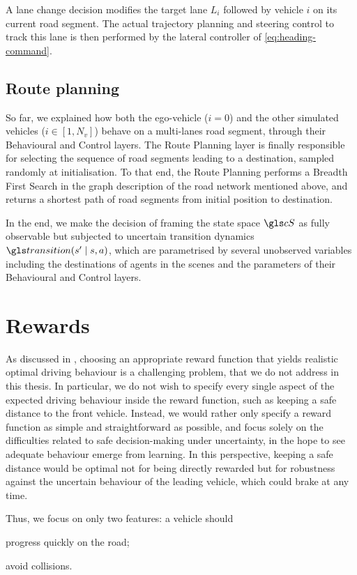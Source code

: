 A lane change decision modifies the target lane $L_i$ followed by vehicle $i$ on its current road segment. The actual trajectory planning and steering control to track this lane is then performed by the lateral controller of \eqref{eq:heading-command}.

\subsection{Route planning}

So far, we explained how both the ego-vehicle ($i=0$) and the other simulated vehicles ($i\in[1, N_v]$) behave on a multi-lanes road segment, through their Behavioural and Control layers. The Route Planning layer is finally responsible for selecting the sequence of road segments leading to a destination, sampled randomly at initialisation. To that end, the Route Planning performs a Breadth First Search in the graph description of the road network mentioned above, and returns a shortest path of road segments from initial position to destination.

In the end, we make the decision of framing the state space $\cS$ as fully observable but subjected to uncertain transition dynamics $\Ps\parentheses{s' \mid s, a}$, which are parametrised by several unobserved variables including the destinations of agents in the scenes and the parameters of their Behavioural and Control layers.

\section{Rewards}

As discussed in , choosing an appropriate reward function that yields realistic optimal driving behaviour is a challenging problem, that we do not address in this thesis. In particular, we do not wish to specify every single aspect of the expected driving behaviour inside the reward function, such as keeping a safe distance to the front vehicle. Instead, we would rather only specify a reward function as simple and straightforward as possible, and focus solely on the difficulties related to safe decision-making under uncertainty, in the hope to see adequate behaviour emerge from learning. In this perspective, keeping a safe distance would be optimal not for being directly rewarded but for robustness against the uncertain behaviour of the leading vehicle, which could brake at any time.

Thus, we focus on only two features: a vehicle should
\begin{enumerate*}[label=(\roman*)]
	\item progress quickly on the road;
	\item avoid collisions.
\end{enumerate*}

